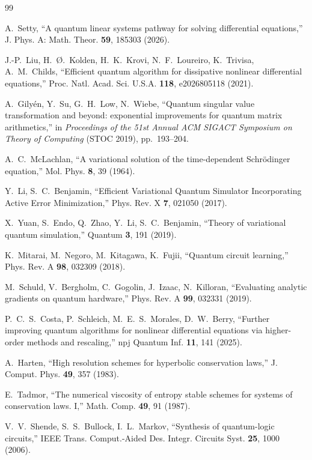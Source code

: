 \documentclass[aps,pra,twocolumn,notitlepage,superscriptaddress,floatfix,10pt]{revtex4-2}
\begin{document}

\begin{thebibliography}{99}

 A.~Setty, ``A quantum linear systems pathway for solving differential equations,''
J. Phys. A: Math. Theor. \textbf{59}, 185303 (2026).

 J.-P.~Liu, H.~{\O}.~Kolden, H.~K.~Krovi, N.~F.~Loureiro, K.~Trivisa, A.~M.~Childs,
``Efficient quantum algorithm for dissipative nonlinear differential equations,'' Proc. Natl. Acad.
Sci. U.S.A. \textbf{118}, e2026805118 (2021).

 A.~Gily{\'e}n, Y.~Su, G.~H.~Low, N.~Wiebe, ``Quantum singular value
transformation and beyond: exponential improvements for quantum matrix arithmetics,'' in
\emph{Proceedings of the 51st Annual ACM SIGACT Symposium on Theory of Computing} (STOC 2019),
pp.~193--204.

 A.~C.~McLachlan, ``A variational solution of the time-dependent Schr\"odinger
equation,'' Mol. Phys. \textbf{8}, 39 (1964).

 Y.~Li, S.~C.~Benjamin, ``Efficient Variational Quantum Simulator Incorporating
Active Error Minimization,'' Phys. Rev. X \textbf{7}, 021050 (2017).

 X.~Yuan, S.~Endo, Q.~Zhao, Y.~Li, S.~C.~Benjamin, ``Theory of variational quantum
simulation,'' Quantum \textbf{3}, 191 (2019).

 K.~Mitarai, M.~Negoro, M.~Kitagawa, K.~Fujii, ``Quantum circuit learning,''
Phys. Rev. A \textbf{98}, 032309 (2018).

 M.~Schuld, V.~Bergholm, C.~Gogolin, J.~Izaac, N.~Killoran, ``Evaluating analytic
gradients on quantum hardware,'' Phys. Rev. A \textbf{99}, 032331 (2019).

 P.~C.~S.~Costa, P.~Schleich, M.~E.~S.~Morales, D.~W.~Berry, ``Further improving
quantum algorithms for nonlinear differential equations via higher-order methods and rescaling,''
npj Quantum Inf. \textbf{11}, 141 (2025).

 A.~Harten, ``High resolution schemes for hyperbolic conservation laws,''
J. Comput. Phys. \textbf{49}, 357 (1983).

 E.~Tadmor, ``The numerical viscosity of entropy stable schemes for systems of
conservation laws. I,'' Math. Comp. \textbf{49}, 91 (1987).

 V.~V.~Shende, S.~S.~Bullock, I.~L.~Markov, ``Synthesis of quantum-logic
circuits,'' IEEE Trans. Comput.-Aided Des. Integr. Circuits Syst. \textbf{25}, 1000 (2006).


\end{thebibliography}
\end{document}
